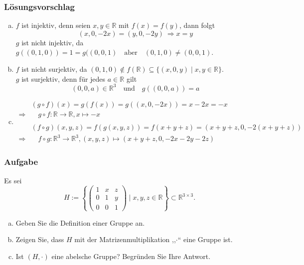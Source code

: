 \documentclass[a4paper,11pt]{scrartcl}
\newcounter{auf}
\newcommand{\Aufgabe}%
        {\addtocounter{auf}{1} \subsubsection*{\rmfamily  Aufgabe \theauf \hspace{1em}} }
\newcommand{\RR}{\mathbb{R}}
\begin{document}
\subsubsection*{Lösungsvorschlag}
\begin{enumerate}[a)]

\item $f$ ist injektiv, denn seien $x,y \in \RR$ mit $f(x)=f(y)$, dann folgt
$$
(x,0,-2x)=(y,0,-2y) \ \Rightarrow x=y
$$
$g$ ist nicht injektiv, da $g((0,1,0))=1=g((0,0,1) \quad \text{aber} \quad (0,1,0) \ne (0,0,1)$.
\item $f$ ist nicht surjektiv, da $(0,1,0) \notin f(\RR) \subseteq \{(x,0,y)\mid x,y \in \RR\} $.\\
$g$ ist surjektiv, denn für jedes $a \in \RR$ gilt
$$
(0,0,a) \in \RR^3 \quad \text{und} \quad g((0,0,a))=a
$$
\item
\begin{align*}
&(g\circ f)(x)=g(f(x))=g((x,0,-2x))=x-2x=-x\\
\Rightarrow&\quad g\circ f :\RR \to \RR, x \mapsto -x\\
&\\
&(f \circ g)(x,y,z)=f(g(x,y,z))=f(x+y+z)=(x+y+z,0,-2(x+y+z))\\
\Rightarrow&\quad f\circ g : \RR^3 \to \RR^3, (x,y,z) \mapsto (x+y+z,0,-2x-2y-2z)
\end{align*}

\end{enumerate}

\newpage
\Aufgabe
Es sei 
$$
H:=\left\{\begin{pmatrix} 1&x&z\\0&1&y\\0&0&1 \end{pmatrix} \mid x,y,z \in \RR \right\} \subset \RR^{3\times 3}.
$$
\begin{enumerate}[a)]
\item Geben Sie die Definition einer Gruppe an.

\item Zeigen Sie, dass $H$ mit der Matrizenmultiplikation ,,$\cdot$`` eine Gruppe ist.

\item Ist $(H,\cdot)$ eine abelsche Gruppe? Begründen Sie Ihre Antwort.

\end{enumerate}

%
%
\end{document}
